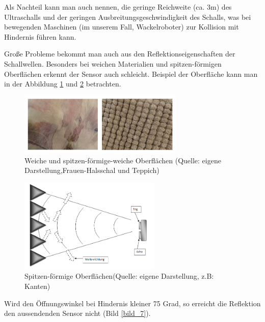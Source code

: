 Als Nachteil kann man auch nennen, die geringe Reichweite (ca. 3m) des Ultraschalls und  der geringen Ausbreitungsgeschwindigkeit des Schalls, was bei  bewegenden Maschinen (im unserem Fall, Wackelroboter) zur Kollision mit Hindernis führen kann.

Große Probleme bekommt man auch aus den Reflektionseigenschaften der Schallwellen. Besonders bei weichen Materialien und spitzen-förmigen Oberflächen erkennt  der Sensor auch schleicht. Beispiel der Oberfläche kann man in der Abbildung \ref{bild_4} und \ref{bild_6} betrachten.

\begin{figure}[!h]  %
	\centering\includegraphics[width=0.7\textwidth]{images/Bild-4-5.png}
	\caption{Weiche und spitzen-förmige-weiche Oberflächen \newline(Quelle: eigene Darstellung,Frauen-Halsschal und Teppich)}
	\label{bild_4}
\end{figure}
\begin{figure}[!h]  %
	\centering\includegraphics[width=0.6\textwidth]{images/Bild-6.png}
	\caption{Spitzen-förmige Oberflächen\newline(Quelle: eigene Darstellung, z.B: Kanten)}
	\label{bild_6}
\end{figure}

Wird den Öffnungswinkel bei Hindernis kleiner 75 Grad, so erreicht die Reflektion den aussendenden Sensor nicht (Bild \ref{bild_7}). 

